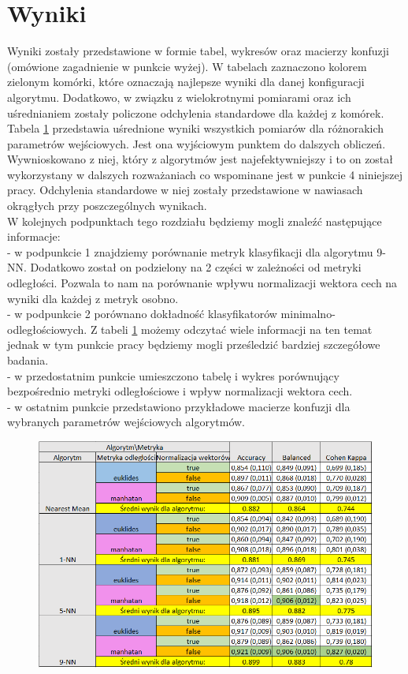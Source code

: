 \documentclass[12pt]{article}
\begin{document}
\section{Wyniki}
Wyniki zostały przedstawione w formie tabel, wykresów oraz macierzy konfuzji (omówione zagadnienie w punkcie wyżej). W tabelach zaznaczono kolorem zielonym komórki, które oznaczają najlepsze wyniki dla danej konfiguracji algorytmu. Dodatkowo, w związku z wielokrotnymi pomiarami oraz ich uśrednianiem zostały policzone odchylenia standardowe dla każdej z komórek. Tabela  \ref{glowna_tabela} przedstawia uśrednione wyniki wszystkich pomiarów dla różnorakich parametrów wejściowych. Jest ona wyjściowym punktem do dalszych obliczeń. Wywnioskowano z niej, który z algorytmów jest najefektywniejszy i to on został wykorzystany w dalszych rozważaniach co wspominane jest w punkcie 4 niniejszej pracy.  Odchylenia standardowe w niej zostały przedstawione w nawiasach okrągłych przy poszczególnych wynikach. \\
\indent W kolejnych podpunktach tego rozdziału będziemy mogli znaleźć następujące informacje: \\
- w podpunkcie 1 znajdziemy porównanie metryk klasyfikacji dla algorytmu 9-NN. Dodatkowo został on podzielony na 2 części w zależności od metryki odległości. Pozwala to nam na porównanie wpływu normalizacji wektora cech na wyniki dla każdej z metryk osobno.\\
- w podpunkcie 2 porównano dokładność klasyfikatorów minimalno-odległościowych. Z tabeli \ref{glowna_tabela} możemy odczytać wiele informacji na ten temat jednak w tym punkcie pracy będziemy mogli prześledzić bardziej szczegółowe badania.\\
- w przedostatnim punkcie umieszczono tabelę i wykres porównujący bezpośrednio metryki odległościowe i wpływ normalizacji wektora cech.\\
- w ostatnim punkcie przedstawiono przykładowe macierze konfuzji dla wybranych parametrów wejściowych algorytmów.
\newpage 
\begin{figure}[H]
	\centering
	\label{glowna_tabela}
		\includegraphics[scale=0.75]{images/ogolna_tabela.png}
\end{figure}
\end{document}
